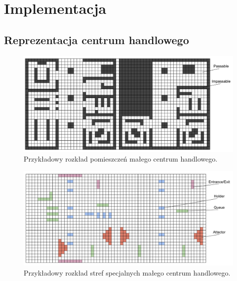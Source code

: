 \documentclass[a4paper, 12pt]{article}
\begin{document}
\newpage
    \section{Implementacja}
    \label{sec:implementation}


        \subsection{Reprezentacja centrum handlowego}
        \label{sec:mall-impl}

        \begin{figure}[H]
            \centering
            \includegraphics[scale=0.2]{./img/MallLayout.pdf}
            \caption{Przykładowy rozkład pomieszczeń małego centrum handlowego.}
            \label{fig:mall-layout}
        \end{figure}

        \begin{figure}[H]
            \centering
            \includegraphics[scale=0.2]{./img/MallFeatures.pdf}
            \caption{Przykładowy rozkład stref specjalnych małego centrum handlowego.}
            \label{fig:mall-features}
        \end{figure}

\end{document}
